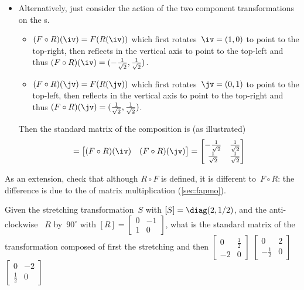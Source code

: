\begin{example}
\begin{solution}
\begin{itemize}
\item Alternatively, just consider the action of the two component transformations on the s.
\begin{itemize}
\item \((F\circ R)(\iv)=F(R(\iv))\) which first rotates~\(\iv=(1,0)\) to point to the top-right, then reflects in the vertical axis to point to the top-left and thus \((F\circ R)(\iv)=(-\rt,\rt)\).
\item \((F\circ R)(\jv)=F(R(\jv))\) which first rotates~\(\jv=(0,1)\) to point to the top-left, then reflects in the vertical axis to point to the top-right and thus \((F\circ R)(\jv)=(\rt,\rt)\).
\end{itemize}
Then the standard matrix of the composition is (as illustrated)
%
\begin{equation*}
[F\circ R]=\begin{bmatrix}(F\circ R)(\iv)&(F\circ R)(\jv)  \end{bmatrix}
=\begin{bmatrix} -\rt&\rt\\\rt&\rt \end{bmatrix}
\end{equation*}
\end{itemize}
\end{solution}
As an extension, check that although \(R\circ F\) is defined, it is 
different to~\(F\circ R\): the difference is due to the  of matrix multiplication (\cref{sec:fapmo}).
\end{example}



\begin{activity}
Given the stretching transformation~\(S\) with  \([S]=\diag(2,1/2)\), and the anti-clockwise ~\(R\) by~\(90^\circ\) with  \([R]=\begin{bmatrix} 0&-1\\1&0 \end{bmatrix}\), what is the standard matrix of the transformation composed of first the stretching and then 
{\(\begin{bmatrix} 0&\tfrac12\\-2&0 \end{bmatrix}\)}
{\(\begin{bmatrix} 0&2\\-\tfrac12&0 \end{bmatrix}\)}
{\(\begin{bmatrix} 0&-2\\\tfrac12&0 \end{bmatrix}\)}
\end{activity}




